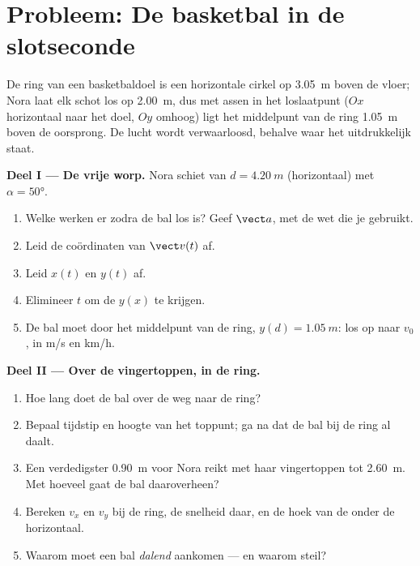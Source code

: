 \section{Probleem: De basketbal in de slotseconde}

\begin{problem}
\label{pb:g12:projectile-motion:1}
De ring van een basketbaldoel is een horizontale cirkel op \qty{3.05}{m}
boven de vloer; Nora laat elk schot los op \qty{2.00}{m}, dus met assen in
het loslaatpunt ($Ox$ horizontaal naar het doel, $Oy$ omhoog) ligt het
middelpunt van de ring \qty{1.05}{m} boven de oorsprong. De lucht wordt
verwaarloosd, behalve waar het uitdrukkelijk staat.

\medskip\noindent\textbf{Deel I --- De vrije worp.} Nora schiet van
$d = \qty{4.20}{m}$ (horizontaal) met  $\alpha = \ang{50}$.
\begin{enumerate}
  \item Welke  werken er zodra de bal los is? Geef $\vect a$, met de
        wet die je gebruikt.
  \item Leid de coördinaten van $\vect v(t)$ af.
  \item Leid $x(t)$ en $y(t)$ af.
  \item Elimineer $t$ om de  $y(x)$ te krijgen.
  \item De bal moet door het middelpunt van de ring, $y(d) = \qty{1.05}{m}$:
        los op naar $v_0$, in \unit{m/s} en \unit{km/h}.
\end{enumerate}

\medskip\noindent\textbf{Deel II --- Over de vingertoppen, in de ring.}
\begin{enumerate}[resume]
  \item Hoe lang doet de bal over de weg naar de ring?
  \item Bepaal tijdstip en hoogte van het toppunt; ga na dat de bal bij de
        ring al daalt.
  \item Een verdedigster \qty{0.90}{m} voor Nora reikt met haar
        vingertoppen tot \qty{2.60}{m}. Met hoeveel gaat de bal daaroverheen?
  \item Bereken $v_x$ en $v_y$ bij de ring, de snelheid daar, en de hoek van
        de  onder de horizontaal.
  \item Waarom moet een bal \emph{dalend} aankomen --- en waarom steil?
\end{enumerate}


\end{problem}
